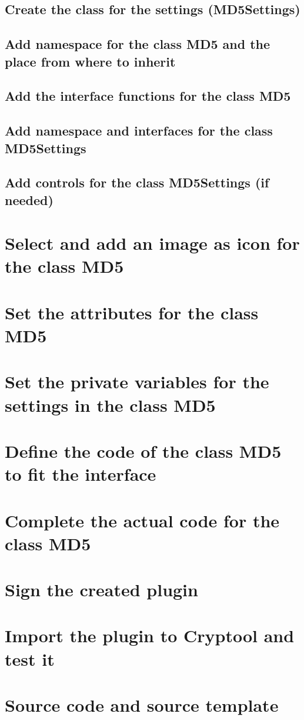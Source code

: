 \subsection{Create the class for the settings (MD5Settings)}\label{sec:CreateTheClassForTheSettingsMD5Settings}
\subsection{Add namespace for the class MD5 and the place from where to inherit}
\label{sec:AddNamespaceForTheClassMD5AndThePlaceFromWhereToInherit}
\subsection{Add the interface functions for the class MD5}\label{sec:AddTheInterfaceFunctionsForTheClassMD5}
\subsection{Add namespace and interfaces for the class MD5Settings}\label{sec:AddNamespaceAndInterfacesForTheClassMD5Settings}
\subsection{Add controls for the class MD5Settings (if needed)}\label{sec:AddControlsForTheClassMD5SettingsIfNeeded}
\section{Select and add an image as icon for the class MD5}\label{sec:SelectAndAddAnImageAsIconForTheClassMD5}
\section{Set the attributes for the class MD5}\label{sec:SetTheAttributesForTheClassMD5}
\section{Set the private variables for the settings in the class MD5}
\label{sec:SetThePrivateVariablesForTheSettingsInTheClassMD5}
\section{Define the code of the class MD5 to fit the interface}\label{sec:DefineTheCodeOfTheClassMD5ToFitTheInterface}
\section{Complete the actual code for the class MD5}\label{sec:CompleteTheActualCodeForTheClassMD5}
\section{Sign the created plugin}\label{sec:SignTheCreatedPlugin}
\section{Import the plugin to Cryptool and test it}\label{sec:ImportThePluginToCryptoolAndTestIt}
\section{Source code and source template}\label{sec:SourceCodeAndSourceTemplate}
